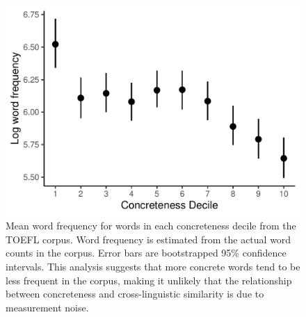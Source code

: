 \documentclass[9pt,twoside,lineno]{pnas-new}
\begin{document}
\pagebreak
\clearpage



\begin{figure}[h]
\centering
\includegraphics[width=5in]{suppfigs/conc_freq_control.pdf}
\caption{ Mean word frequency for words in each concreteness decile from the TOEFL corpus. Word frequency is estimated from the actual word counts in the corpus. Error bars are bootstrapped 95\% confidence intervals. This analysis suggests that more concrete words tend to be less frequent in the corpus, making it unlikely that the relationship between concreteness and cross-linguistic similarity is due to measurement noise.}
\end{figure}

\pagebreak
\clearpage


\end{document}
